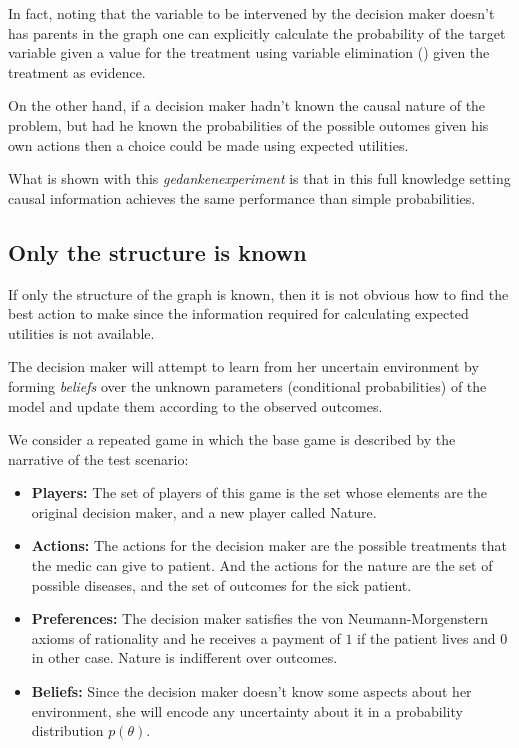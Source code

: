 \documentclass{article}
\begin{document}
In fact, noting that the variable to be intervened by the decision maker doesn't has parents in the graph one can explicitly calculate the probability of the target variable given a value for the treatment using variable elimination (\cite{koller2009probabilistic}) given the treatment as evidence. 

On the other hand, if a decision maker hadn't known the causal nature of the problem, but had he known the probabilities of the possible outomes given his own actions then a choice could be made using expected utilities. 

What is shown with this \textit{gedankenexperiment} is that in this full knowledge setting causal information achieves the same performance than simple probabilities.

\subsection{Only the structure is known}
If only the structure of the graph is known, then it is not obvious how to find the best action to make since the information required for calculating expected utilities is not available.

The decision maker will attempt to learn from her uncertain environment by forming \textit{beliefs} over the unknown parameters (conditional probabilities) of the model and update them according to the observed outcomes. 

We consider a repeated game in which the base game is described by the narrative of the test scenario: 
\begin{itemize}
\item \textbf{Players:} The set of players of this game is the set whose elements are the original decision maker, and a new player called Nature.
\item \textbf{Actions:} The actions for the decision maker are the possible treatments that the medic can give to patient. And the actions for the nature are the set of possible diseases, and the set of outcomes for the sick patient.
\item \textbf{Preferences:} The decision maker satisfies the von Neumann-Morgenstern axioms of rationality and he receives a payment of $1$ if the patient lives and $0$ in other case. Nature is indifferent over outcomes.
\item \textbf{Beliefs:} Since the decision maker doesn't know some aspects about her environment, she will encode any uncertainty about it in a probability distribution $p(\theta)$.
\end{itemize}
\end{document}
